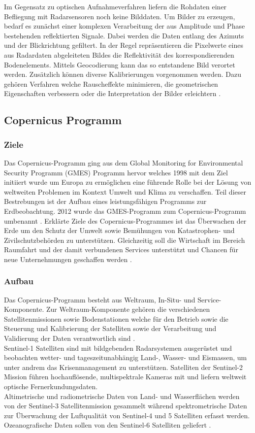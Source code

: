 Im Gegensatz zu optischen Aufnahmeverfahren liefern die Rohdaten 
einer Befliegung mit Radarsensoren noch keine Bilddaten. Um Bilder zu erzeugen, bedarf es zunächst einer komplexen Verarbeitung der aus Amplitude und Phase bestehenden 
reflektierten Signale. Dabei werden die Daten entlang des Azimuts und der Blickrichtung gefiltert. In der Regel repräsentieren die Pixelwerte eines aus Radardaten 
abgeleiteten Bildes die Reflektivität des korrespondierenden Bodenelements. Mittels Geocodierung kann das so entstandene Bild verortet werden. Zusätzlich können diverse 
Kalibrierungen vorgenommen werden. Dazu gehören Verfahren welche Rauscheffekte minimieren, die geometrischen Eigenschaften verbessern oder die Interpretation der Bilder 
erleichtern \cite{tutorial_on_sar}. 

\subsection{Copernicus Programm}
\subsubsection{Ziele}
Das Copernicus-Programm ging aus dem Global Monitoring for Environmental Security Programm (GMES) Programm hervor welches 1998 mit dem Ziel initiiert wurde um Europa 
zu ermöglichen eine führende Rolle bei der Lösung von weltweiten Problemen im Kontext Umwelt und Klima zu verschaffen. Teil dieser Bestrebungen ist der Aufbau eines 
leistungsfähigen Programms zur Erdbeobachtung. 2012 wurde das GMES-Programm zum Copernicus-Programm umbenannt \cite{history_of_copernicus}.
Erklärte Ziele des Copernicus-Programmes ist das Überwachen der Erde um den Schutz der Umwelt sowie Bemühungen von Katastrophen- und Zivilschutzbehörden zu 
unterstützen. Gleichzeitig soll die Wirtschaft im Bereich Raumfahrt und der damit verbundenen Services unterstützt und Chancen für neue Unternehmungen geschaffen
werden \cite{copernicus_regulation}.

\subsubsection{Aufbau}
Das Copernicus-Programm besteht aus Weltraum, In-Situ- und Service-Komponente. 
Zur Weltraum-Komponente gehören die verschiedenen Satellitenmissionen sowie Bodenstationen welche für den Betrieb sowie die Steuerung und Kalibrierung der 
Satelliten sowie der Verarbeitung und Validierung der Daten verantwortlich sind \cite{copernicus_regulation}. \\ 
Sentinel-1 Satelliten sind mit bildgebenden Radarsystemen ausgerüstet und beobachten wetter- und tageszeitunabhängig Land-, Wasser- und Eismassen, um unter andrem das 
Krisenmanagement zu unterstützen.
Satelliten der Sentinel-2 Mission führen hochauflösende, multispektrale Kameras mit und liefern weltweit optische Fernerkundungsdaten. \\
Altimetrische und radiometrische Daten von Land- und Wasserflächen werden von der Sentinel-3 Satellitenmission gesammelt während spektrometrische Daten zur 
Überwachung der Luftqualität von Sentinel-4 und 5 Satelliten erfasst werden.
Ozeanografische Daten sollen von den Sentinel-6 Satelliten geliefert \cite{sentinel_overview}.

